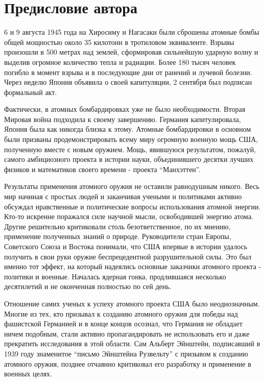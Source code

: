 \chapter*{Предисловие автора}

6 и 9 августа 1945 года на Хиросиму и Нагасаки были сброшены атомные бомбы общей мощностью около 35 килотонн в тротиловом эквиваленте.
Взрывы произошли в 500 метрах над землей, сформировав сильнейшую ударную волну и выделив огромное количество тепла и радиации.
Более 180 тысяч человек погибло в момент взрыва и в последующие дни от ранений и лучевой болезни.
Через неделю Япония объявила о своей капитуляции, 2 сентября был подписан формальный акт.

Фактически, в атомных бомбардировках уже не было необходимости. 
Вторая Мировая война подходила к своему завершению. 
Германия капитулировала, Япония была как никогда близка к этому.
Атомные бомбардировки в основном были призваны продемонстрировать всему миру огромную военную мощь США, полученную вместе с новым оружием.
Мощь, явившуюся результатом, пожалуй, самого амбициозного проекта в истории науки, объединившего десятки лучших физиков и математиков своего времени - проекта ``Манхэттен''.

Результаты применения атомного оружия не оставили равнодушным никого.
Весь мир начиная с простых людей и заканчивая учеными и политиками активно обсуждал нравственные и политические вопросы использования атомной энергии.
Кто-то искренне поражался силе научной мысли, освободившей энергию атома.
Другие решительно критиковали столь безответственное, по их мнению, применение полученных знаний о природе.
Руководители стран Европы, Советского Союза и Востока понимали, что США впервые в истории удалось получить в свои руки оружие беспрецедентной разрушительной силы. 
Это был именно тот эффект, на который надеялись основные заказчики атомного проекта - политики и военные.  
Началась ядерная гонка, продлившаяся несколько десятилетий и не оконченная полностью по сей день.

Отношение самих ученых к успеху атомного проекта США было неоднозначным.
Многие из тех, кто призывал к созданию атомного оружия для победы над фашистской Германией и в конце концов осознал, что Германия не обладает ничем подобным, стали активно пропагандировать не использовать его и даже прекратить исследования в этой области. 
Сам Альберт Эйнштейн, подписавший в 1939 году знаменитое ``письмо Эйнштейна Рузвельту'' с призывом к созданию атомного оружия, позднее отчаянно критиковал его разработку и применение в военных целях.

